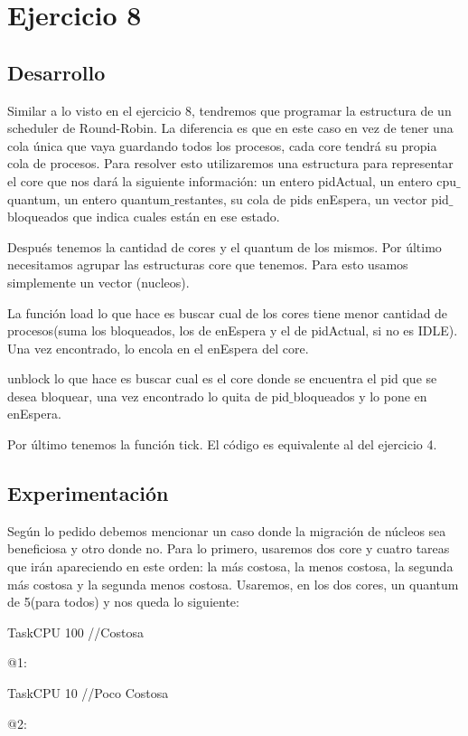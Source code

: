 \section{Ejercicio 8}


\subsection{Desarrollo}
Similar  a lo visto en el ejercicio 8, tendremos que programar la estructura de un scheduler de Round-Robin. La diferencia es que en este caso en vez de tener una cola única 
que vaya guardando todos los procesos, cada core tendrá su propia cola de procesos. Para resolver esto utilizaremos una estructura para representar el core que nos dará la 
siguiente información: un entero pidActual, un entero cpu$\_$quantum, un entero quantum$\_$restantes, su cola de pids enEspera, un vector pid$\_$bloqueados que indica cuales están en ese estado.

Después tenemos la cantidad de cores y el quantum de los mismos. Por último necesitamos agrupar las estructuras core que tenemos. Para esto usamos simplemente un vector 
(nucleos).

La función load lo que hace es buscar cual de los cores tiene menor cantidad de procesos(suma los bloqueados, los de enEspera y el de pidActual, si no es IDLE). Una vez 
encontrado, lo encola en el enEspera del core.

unblock lo que hace es buscar cual es el core donde se encuentra el pid que se desea bloquear, una vez encontrado lo quita de pid$\_$bloqueados y lo pone en enEspera.

Por último tenemos la función tick. El código es equivalente al del ejercicio 4.


\subsection{Experimentación}
Según lo pedido debemos mencionar un caso donde la migración de núcleos sea beneficiosa y otro donde no. Para lo primero, usaremos dos core y cuatro tareas que irán apareciendo
en este orden: la más costosa,  la menos costosa, la segunda más costosa y la segunda menos costosa. Usaremos, en los dos cores, un quantum de 5(para todos) y nos queda lo siguiente:

TaskCPU 100   	//Costosa

@1:

TaskCPU 10 	//Poco Costosa

@2:

